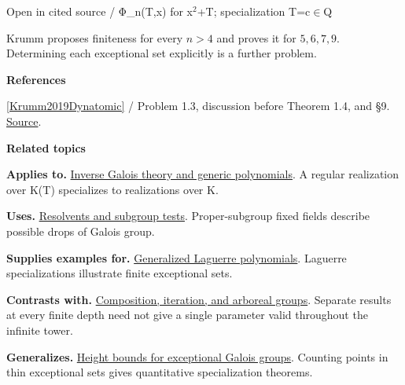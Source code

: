\documentclass[11pt,a4paper,oneside,openany]{book}
\newenvironment{sources}{\par\smallskip\begingroup\footnotesize\color{atlasgray}\leftskip=10pt\setlength{\parskip}{2pt}}{\par\endgroup\smallskip}
\begin{document}
{\small\sffamily\color{atlasgold}Open in cited source / Φ\_\allowbreak{}n(T,x) for x\ensuremath{{}^2}+T; specialization T=c\ensuremath{\in}Q}\par\smallskip
\color{black} Krumm proposes finiteness for every \(n>4\) and proves it for \(5,6,7,9\). Determining each exceptional set explicitly is a further problem.\par
\begin{sources}
\textbf{References}\par\smallskip
\noindent\hyperlink{ref:Krumm2019Dynatomic}{[Krumm2019Dynatomic]} / Problem 1.3, discussion before Theorem 1.4, and §9.  \href{https://doi.org/10.2140/ant.2019.13.963}{Source}.\par
\end{sources}\color{black}
\par\medskip\begingroup\footnotesize\setlength{\parskip}{1pt}\textbf{\sffamily\color{atlasgreen}Related topics}\par
\color{black}\textbf{Applies to.} \hyperlink{article:inverse-galois}{Inverse Galois theory and generic polynomials}. A regular realization over K(T) specializes to realizations over K.\par
\color{black}\textbf{Uses.} \hyperlink{article:resolvents}{Resolvents and subgroup tests}. Proper-subgroup fixed fields describe possible drops of Galois group.\par
\color{black}\textbf{Supplies examples for.} \hyperlink{article:laguerre}{Generalized Laguerre polynomials}. Laguerre specializations illustrate finite exceptional sets.\par
\color{black}\textbf{Contrasts with.} \hyperlink{article:composition-iteration}{Composition, iteration, and arboreal groups}. Separate results at every finite depth need not give a single parameter valid throughout the infinite tower.\par
\color{black}\textbf{Generalizes.} \hyperlink{article:height-counting}{Height bounds for exceptional Galois groups}. Counting points in thin exceptional sets gives quantitative specialization theorems.\par
\endgroup
\end{document}
